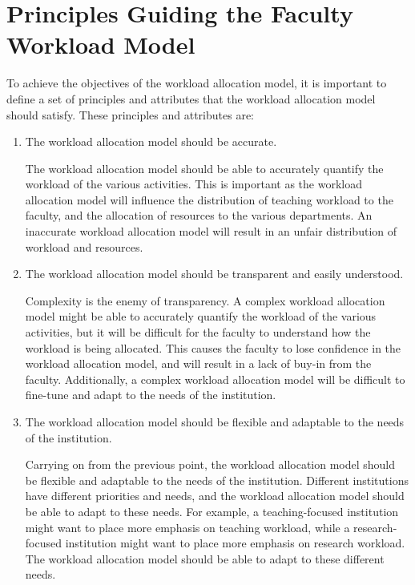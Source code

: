 \section{Principles Guiding the Faculty Workload Model}
\label{sec:principles_guiding_workload_allocation_model}

To achieve the objectives of the workload allocation model, it is important to define a set of principles and attributes that the workload allocation model should satisfy. These principles and attributes are:

\begin{enumerate}

      \item The workload allocation model should be accurate.

            The workload allocation model should be able to accurately quantify the workload of the various activities. This is important as the workload allocation model will influence the distribution of teaching workload to the faculty, and the allocation of resources to the various departments. An inaccurate workload allocation model will result in an unfair distribution of workload and resources.

      \item The workload allocation model should be transparent and easily understood.

            Complexity is the enemy of transparency. A complex workload allocation model might be able to accurately quantify the workload of the various activities, but it will be difficult for the faculty to understand how the workload is being allocated. This causes the faculty to lose confidence in the workload allocation model, and will result in a lack of buy-in from the faculty. Additionally, a complex workload allocation model will be difficult to fine-tune and adapt to the needs of the institution.

      \item The workload allocation model should be flexible and adaptable to the needs of the institution.

            Carrying on from the previous point, the workload allocation model should be flexible and adaptable to the needs of the institution. Different institutions have different priorities and needs, and the workload allocation model should be able to adapt to these needs. For example, a teaching-focused institution might want to place more emphasis on teaching workload, while a research-focused institution might want to place more emphasis on research workload. The workload allocation model should be able to adapt to these different needs.


\end{enumerate}
